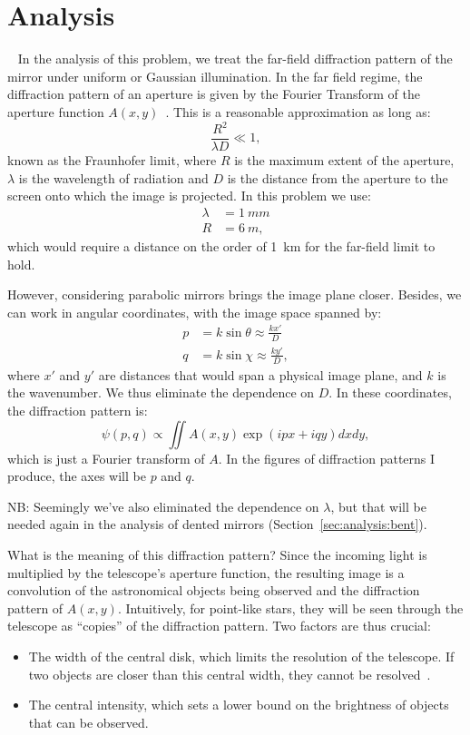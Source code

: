 \documentclass{article}
\begin{document}
\section{Analysis}~\label{sec:analysis}
In the analysis of this problem, we treat the far-field diffraction pattern of the mirror under uniform or Gaussian illumination. In the far field regime, the diffraction pattern of an aperture is given by the Fourier Transform of the aperture function \( A(x,y) \)~\cite[Chapter 10.2]{hecht}. This is a reasonable approximation as long as:
\begin{equation}\label{eqn:fraunhofer}
    \frac{R^2}{\lambda D} \ll 1,
\end{equation}
known as the Fraunhofer limit, where $R$ is the maximum extent of the aperture, $\lambda$ is the wavelength of radiation and $D$ is the distance from the aperture to the screen onto which the image is projected. In this problem we use:
\begin{align*}
    \lambda &= \SI{1}{mm} \\
    R &= \SI{6}{m},
\end{align*}
which would require a distance on the order of \SI{1}{km} for the far-field limit to hold. 

However, considering parabolic mirrors brings the image plane closer. Besides, we can work in angular coordinates, with the image space spanned by:
\begin{align*}
    p &= k \sin{\theta} \approx \frac{k x'}{D} \\
    q &= k \sin{\chi} \approx \frac{k y'}{D},
\end{align*}
where $x'$ and $y'$ are distances that would span a physical image plane, and $k$ is the wavenumber. We thus eliminate the dependence on $D$. In these coordinates, the diffraction pattern is:
\begin{equation}\label{eqn:diff}
    \psi(p, q) \propto \iint A(x, y) \exp \left( ipx + iqy \right) dx dy,
\end{equation}
which is just a Fourier transform of $A$. In the figures of diffraction patterns I produce, the axes will be $p$ and $q$.

NB: Seemingly we've also eliminated the dependence on $\lambda$, but that will be needed again in the analysis of dented mirrors (Section~\ref{sec:analysis:bent}).

What is the meaning of this diffraction pattern? Since the incoming light is multiplied by the telescope's aperture function, the resulting image is a convolution of the astronomical objects being observed and the diffraction pattern of $A(x, y)$. Intuitively, for point-like stars, they will be seen through the telescope as ``copies'' of the diffraction pattern. Two factors are thus crucial:
\begin{itemize}
    \item The width of the central disk, which limits the resolution of the telescope. If two objects are closer than this central width, they cannot be resolved~\cite[Section~10.2.6]{hecht}.
    \item The central intensity, which sets a lower bound on the brightness of objects that can be observed.
\end{itemize}
\end{document}

